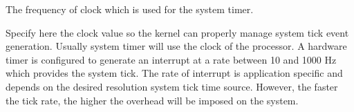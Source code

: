 The frequency of clock which is used for the system timer. 

Specify here the clock value so the kernel can properly manage system tick event generation. Usually system timer will use the clock of the processor. A hardware timer is configured to generate an interrupt at a rate between 10 and 1000 Hz which provides the system tick. The rate of interrupt is application specific and depends on the desired resolution system tick time source. However, the faster the tick rate, the higher the overhead will be imposed on the system. 